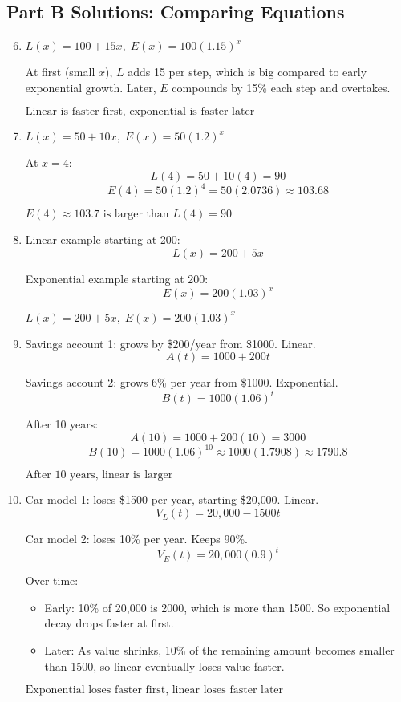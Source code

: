 \documentclass[12pt]{article}
\begin{document}
\subsection*{Part B Solutions: Comparing Equations}
\begin{enumerate}
  \setcounter{enumi}{5}
  \item \(L(x) = 100 + 15x,\; E(x) = 100(1.15)^x\)

  At first (small \(x\)), \(L\) adds 15 per step, which is big compared to early exponential growth.  
  Later, \(E\) compounds by 15\% each step and overtakes.

  \(\boxed{\text{Linear is faster first, exponential is faster later}}\)

  \item \(L(x) = 50 + 10x,\; E(x) = 50(1.2)^x\)

  At \(x = 4\):
  \[
  L(4) = 50 + 10(4) = 90
  \]
  \[
  E(4) = 50(1.2)^4 = 50(2.0736) \approx 103.68
  \]

  \(\boxed{E(4) \approx 103.7 \text{ is larger than } L(4)=90}\)

  \item Linear example starting at 200:  
  \[
  L(x) = 200 + 5x
  \]

    
  Exponential example starting at 200:  
  \[
  E(x) = 200(1.03)^x
  \]


  \(\boxed{L(x)=200+5x,\; E(x)=200(1.03)^x}\)

  \item Savings account 1: grows by \$200/year from \$1000. Linear.
  \[
  A(t) = 1000 + 200t
  \]

  Savings account 2: grows 6\% per year from \$1000. Exponential.
  \[
  B(t) = 1000(1.06)^t
  \]

  After 10 years:
  \[
  A(10) = 1000 + 200(10) = 3000
  \]
  \[
  B(10) = 1000(1.06)^{10} \approx 1000(1.7908) \approx 1790.8
  \]

  \(\boxed{\text{After 10 years, linear is larger}}\)

  \item Car model 1: loses \$1500 per year, starting \$20{,}000. Linear.
  \[
  V_L(t) = 20{,}000 - 1500t
  \]

  Car model 2: loses 10\% per year. Keeps 90\%.
  \[
  V_E(t) = 20{,}000(0.9)^t
  \]

  Over time:
  \begin{itemize}
    \item Early: 10\% of 20{,}000 is 2000, which is more than 1500. So exponential decay drops faster at first.
    \item Later: As value shrinks, 10\% of the remaining amount becomes smaller than 1500, so linear eventually loses value faster.
  \end{itemize}

  \(\boxed{\text{Exponential loses faster first, linear loses faster later}}\)
\end{enumerate}
\end{document}
